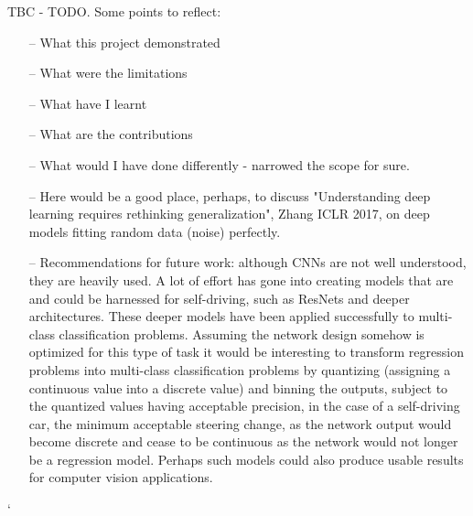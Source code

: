TBC - TODO. Some points to reflect:
\begin{itemize}
    \item[--] What this project demonstrated
    \item[--] What were the limitations
    \item[--] What have I learnt
    \item[--] What are the contributions
    \item[--] What would I have done differently - narrowed the scope for sure.
    \item[--] Here would be a good place, perhaps, to discuss "Understanding deep learning requires rethinking generalization", Zhang ICLR 2017, on deep models fitting random data (noise) perfectly. 
    \item[--] Recommendations for future work: although CNNs are not well understood, they are heavily used. A lot of effort has gone into creating models that are and could be harnessed for self-driving, such as ResNets and deeper architectures. These deeper models have been applied successfully to multi-class classification problems. Assuming the network design somehow is optimized for this type of task it would be interesting to transform regression problems into multi-class classification problems by quantizing (assigning a continuous value into a discrete value) and binning the outputs, subject to the quantized values having acceptable precision, in the case of a self-driving car, the minimum acceptable steering change, as the network output would become discrete and cease to be continuous as the network would not longer be a regression model.
    Perhaps such models could also produce usable results for computer vision applications.
\end{itemize}



`
